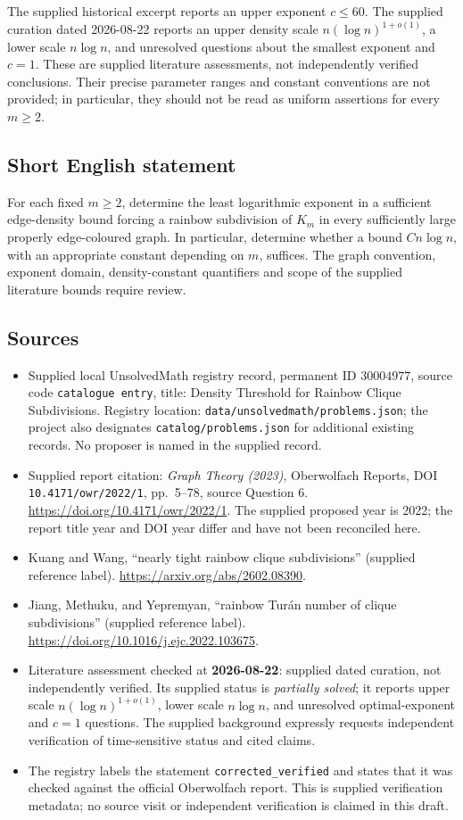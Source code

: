 \documentclass[11pt]{article}
\begin{document}
The supplied historical excerpt reports an upper exponent \(c\leq 60\). The supplied curation dated 2026-08-22 reports an upper density scale \(n(\log n)^{1+o(1)}\), a lower scale \(n\log n\), and unresolved questions about the smallest exponent and \(c=1\). These are supplied literature assessments, not independently verified conclusions. Their precise parameter ranges and constant conventions are not provided; in particular, they should not be read as uniform assertions for every \(m\geq 2\).
\subsection{Short English statement}
For each fixed \(m\geq 2\), determine the least logarithmic exponent in a sufficient edge-density bound forcing a rainbow subdivision of \(K_m\) in every sufficiently large properly edge-coloured graph. In particular, determine whether a bound \(Cn\log n\), with an appropriate constant depending on \(m\), suffices. The graph convention, exponent domain, density-constant quantifiers and scope of the supplied literature bounds require review.
\subsection{Sources}
\begin{itemize}
\item Supplied local UnsolvedMath registry record, permanent ID \(30004977\), source code \texttt{catalogue entry}, title: Density Threshold for Rainbow Clique Subdivisions. Registry location: \texttt{data/unsolvedmath/problems.json}; the project also designates \texttt{catalog/problems.json} for additional existing records. No proposer is named in the supplied record.
\item Supplied report citation: \emph{Graph Theory (2023)}, Oberwolfach Reports, DOI \texttt{10.4171/owr/2022/1}, pp.\ 5--78, source Question 6. \url{https://doi.org/10.4171/owr/2022/1}. The supplied proposed year is 2022; the report title year and DOI year differ and have not been reconciled here.
\item Kuang and Wang, ``nearly tight rainbow clique subdivisions'' (supplied reference label). \url{https://arxiv.org/abs/2602.08390}.
\item Jiang, Methuku, and Yepremyan, ``rainbow Tur\'an number of clique subdivisions'' (supplied reference label). \url{https://doi.org/10.1016/j.ejc.2022.103675}.
\item Literature assessment checked at \textbf{2026-08-22}: supplied dated curation, not independently verified. Its supplied status is \emph{partially solved}; it reports upper scale \(n(\log n)^{1+o(1)}\), lower scale \(n\log n\), and unresolved optimal-exponent and \(c=1\) questions. The supplied background expressly requests independent verification of time-sensitive status and cited claims.
\item The registry labels the statement \texttt{corrected\_verified} and states that it was checked against the official Oberwolfach report. This is supplied verification metadata; no source visit or independent verification is claimed in this draft.
\end{itemize}
\end{document}
